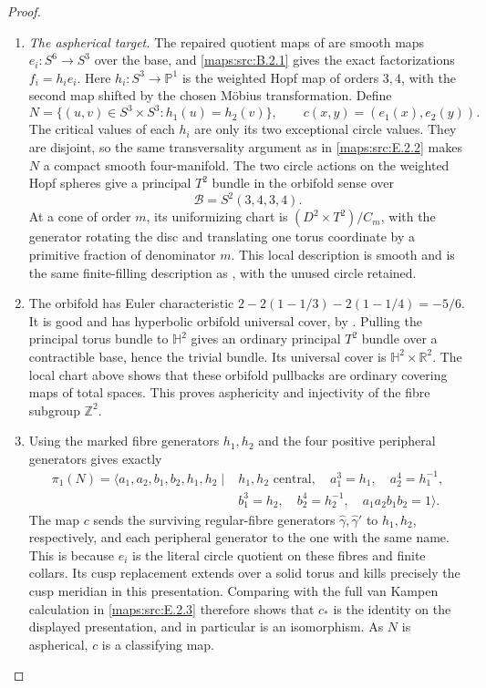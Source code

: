 \begin{proof}
\begin{enumerate}[label=\arabic*.,leftmargin=*]
\item \emph{The aspherical target.}
The repaired quotient maps of  are smooth maps
$e_i:S^6\to S^3$ over the base, and \ref{maps:src:B.2.1} gives the exact
factorizations $f_i=h_i e_i$. Here $h_i:S^3\to\mathbb P^1$
is the weighted Hopf map of orders $3,4$, with the second
map shifted by the chosen M\"obius transformation. Define
\[
 N=\{(u,v)\in S^3\times S^3:h_1(u)=h_2(v)\},\qquad
 c(x,y)=(e_1(x),e_2(y)).
 \tag{E.B5}\label{maps:eq:E.B5}
\]
The critical values of each $h_i$ are only its two exceptional
circle values. They are disjoint, so the same transversality
argument as in \ref{maps:src:E.2.2} makes $N$ a compact smooth four-manifold.
The two circle actions on the weighted Hopf spheres give a
principal $T^2$ bundle in the orbifold sense over
\[
                  \mathcal B=S^2(3,4,3,4).
\]
At a cone of order $m$, its uniformizing chart is
$(D^2\times T^2)/C_m$, with the generator rotating the disc
and translating one torus coordinate by a primitive fraction
of denominator $m$. This local description is smooth and is
the same finite-filling description as , with the unused
circle retained.

\item The orbifold has Euler characteristic
$2-2(1-1/3)-2(1-1/4)=-5/6$. It is good and has hyperbolic
orbifold universal cover, by
\cite[Theorems 2.3--2.4 and the Euler-number discussion in
Section 2]{rootScott83}. Pulling the principal torus bundle to
$\mathbb H^2$ gives an ordinary principal $T^2$ bundle over a
contractible base, hence the trivial bundle. Its universal
cover is $\mathbb H^2\times\mathbb R^2$. The local chart above
shows that these orbifold pullbacks are ordinary covering maps
of total spaces. This proves asphericity and injectivity of
the fibre subgroup $\mathbb Z^2$.

\item Using the marked fibre generators $h_1,h_2$ and the four
positive peripheral generators gives exactly
\[
 \begin{split}
 \pi_1(N)=\langle a_1,a_2,b_1,b_2,h_1,h_2\mid {}&h_1,h_2
       \text{ central},\quad a_1^3=h_1,\quad a_2^4=h_1^{-1},\\
 &b_1^3=h_2,\quad b_2^4=h_2^{-1},\quad
 a_1a_2b_1b_2=1\rangle.
 \end{split}
\]
The map $c$ sends the surviving regular-fibre generators
$\widehat\gamma,\widehat\gamma'$ to $h_1,h_2$, respectively,
and each peripheral generator to the one with the same name.
This is because $e_i$ is the literal circle quotient on these
fibres and finite collars. Its cusp replacement extends over
a solid torus and kills precisely the cusp meridian in this
presentation. Comparing with the full van Kampen calculation
in \ref{maps:src:E.2.3} therefore shows that $c_*$ is the identity on the
displayed presentation, and in particular is an isomorphism.
As $N$ is aspherical, $c$ is a classifying map.


\end{enumerate}
\end{proof}
